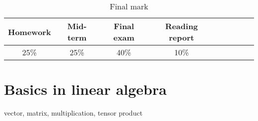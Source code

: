 \documentclass[onecolumn,pra,superscriptaddress]{revtex4-1}
\begin{document}
\begin{table} [htb]
\centering
\caption{Final mark} \label{tab:FinalMark}
\label{Tab:Result}
\begin{tabular}{ccccccccc}
\hline
Homework & Mid-term & Final exam & Reading report \\
\hline
25\% & 25\% & 40\% & 10\% \\
\hline
\end{tabular}
\end{table}


\section{Basics in linear algebra}
vector, matrix, multiplication, tensor product




%
%




\end{document}
